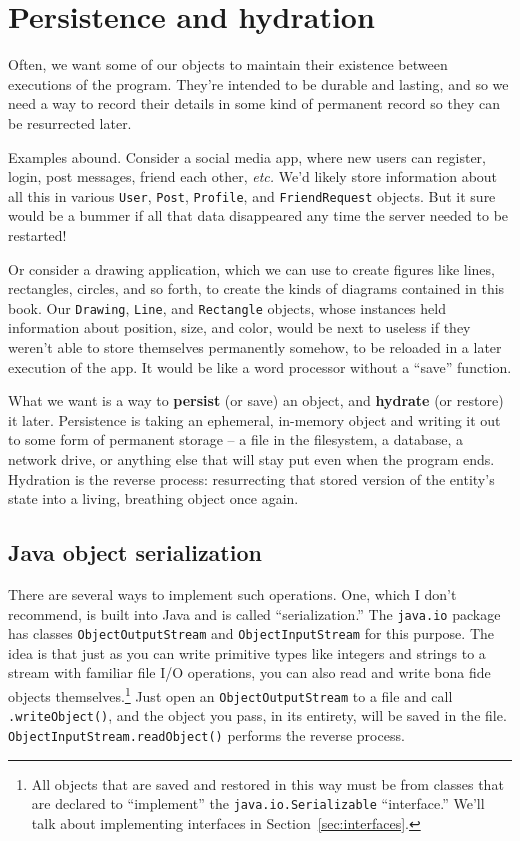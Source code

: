 
\chapter{Persistence and hydration}

Often, we want some of our objects to maintain their existence between
executions of the program. They're intended to be durable and lasting, and so
we need a way to record their details in some kind of permanent record so they
can be resurrected later.

Examples abound. Consider a social media app, where new users can register,
login, post messages, friend each other, \textit{etc.} We'd likely store
information about all this in various \texttt{User}, \texttt{Post},
\texttt{Profile}, and \texttt{FriendRequest} objects. But it sure would be a
bummer if all that data disappeared any time the server needed to be
restarted!

Or consider a drawing application, which we can use to create figures like
lines, rectangles, circles, and so forth, to create the kinds of diagrams
contained in this book. Our \texttt{Drawing}, \texttt{Line}, and
\texttt{Rectangle} objects, whose instances held information about position,
size, and color, would be next to useless if they weren't able to store
themselves permanently somehow, to be reloaded in a later execution of the
app. It would be like a word processor without a ``save'' function.

What we want is a way to \textbf{persist} (or save) an object, and
\textbf{hydrate} (or restore) it later. Persistence is taking an ephemeral,
in-memory object and writing it out to some form of permanent storage -- a
file in the filesystem, a database, a network drive, or anything else that
will stay put even when the program ends. Hydration is the reverse process:
resurrecting that stored version of the entity's state into a living,
breathing object once again.

\section{Java object serialization}

There are several ways to implement such operations. One, which I don't
recommend, is built into Java and is called ``serialization.'' The
\texttt{java.io} package has classes \texttt{ObjectOutputStream} and
\texttt{ObjectInputStream} for this purpose. The idea is that just as you can
write primitive types like integers and strings to a stream with familiar file
I/O operations, you can also read and write bona fide objects
themselves.\footnote{All objects that are saved and restored in this way must
be from classes that are declared to ``implement'' the
\texttt{java.io.Serializable} ``interface.'' We'll talk about implementing
interfaces in Section~\ref{sec:interfaces}.} Just open an
\texttt{ObjectOutputStream} to a file and call \texttt{.writeObject()}, and
the object you pass, in its entirety, will be saved in the file.
\texttt{ObjectInputStream.readObject()} performs the reverse process.

